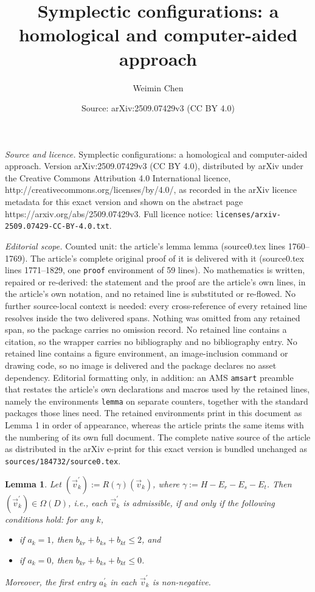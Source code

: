 \documentclass[10pt,a4paper]{amsart}
\title{Symplectic configurations: a homological and computer-aided approach}
\author{Weimin Chen}
\date{Source: arXiv:2509.07429v3 (CC BY 4.0)}
\newtheorem{lemma}{Lemma}
\begin{document}
\maketitle

\noindent\emph{Source and licence.} Symplectic configurations: a homological and computer-aided approach. Version arXiv:2509.07429v3 (CC BY 4.0), distributed by arXiv under the Creative Commons Attribution 4.0 International licence, http://creativecommons.org/licenses/by/4.0/, as recorded in the arXiv licence metadata for this exact version and shown on the abstract page https://arxiv.org/abs/2509.07429v3. Full licence notice: \texttt{licenses/arxiv-2509.07429-CC-BY-4.0.txt}.\par\smallskip

\noindent\textit{Editorial scope.} Counted unit: the article's lemma lemma (source0.tex lines 1760--1769). The article's complete original proof of it is delivered with it (source0.tex lines 1771--1829, one \texttt{proof} environment of 59 lines). No mathematics is written, repaired or re-derived: the statement and the proof are the article's own lines, in the article's own notation, and no retained line is substituted or re-flowed.  No further source-local context is needed: every cross-reference of every retained line resolves inside the two delivered spans.  Nothing was omitted from any retained span, so the package carries no omission record.  No retained line contains a citation, so the wrapper carries no bibliography and no bibliography entry.  No retained line contains a figure environment, an image-inclusion command or drawing code, so no image is delivered and the package declares no asset dependency.  Editorial formatting only, in addition: an AMS \texttt{amsart} preamble that restates the article's own declarations and macros used by the retained lines, namely the environments \texttt{lemma} on separate counters, together with the standard packages those lines need.  The retained environments print in this document as Lemma 1 in order of appearance, whereas the article prints the same items with the numbering of its own full document.  The complete native source of the article as distributed in the arXiv e-print for this exact version is bundled unchanged as \texttt{sources/184732/source0.tex}.
\begin{lemma}
Let $(\vec{v}_k^\prime):=R(\gamma)(\vec{v}_k)$, where $\gamma:=H-E_r-E_s-E_t$. 
Then $(\vec{v}_k^\prime)\in\Omega(D)$, i.e., each 
$\vec{v}_k^\prime$ is admissible, if and only if the following conditions hold: for any $k$,
\begin{itemize}
\item [{(i)}] if $a_k=1$, then $b_{kr}+b_{ks}+b_{kt}\leq 2$, and 
\item [{(ii)}] if $a_k=0$, then $b_{kr}+b_{ks}+b_{kt}\leq 0$. 
\end{itemize}
Moreover, the first entry $a_k^\prime$ in each $\vec{v}_k^\prime$ is non-negative. 
\end{lemma}
\end{document}
